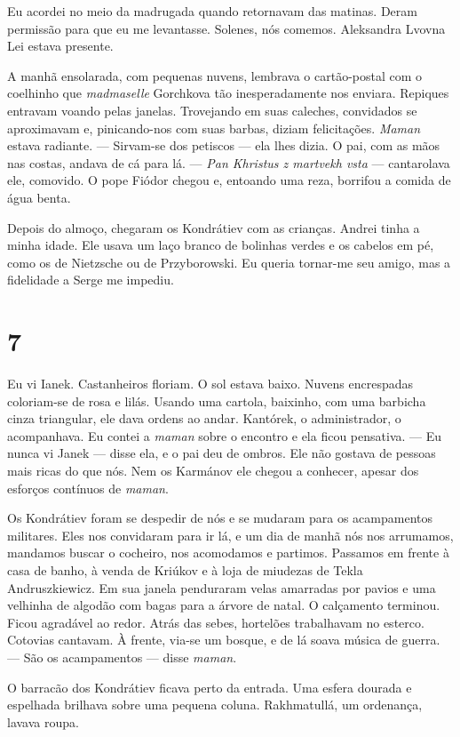 Eu acordei no meio da madrugada quando retornavam das matinas. Deram
permissão para que eu me levantasse. Solenes, nós comemos. Aleksandra
Lvovna Lei estava presente.

A manhã ensolarada, com pequenas nuvens, lembrava o cartão-postal com o
coelhinho que \emph{madmaselle} Gorchkova tão inesperadamente nos
enviara. Repiques entravam voando pelas janelas. Trovejando em suas
caleches, convidados se aproximavam e, pinicando-nos com suas barbas,
diziam felicitações. \emph{Maman} estava radiante. --- Sirvam-se dos
petiscos --- ela lhes dizia. O pai, com as mãos nas costas, andava de cá
para lá. --- \emph{Pan Khristus z martvekh vsta} --- cantarolava ele,
comovido. O pope Fiódor chegou e, entoando uma reza, borrifou a comida
de água benta.

Depois do almoço, chegaram os Kondrátiev com as crianças. Andrei tinha a
minha idade. Ele usava um laço branco de bolinhas verdes e os cabelos em
pé, como os de Nietzsche ou de Przyborowski. Eu queria tornar-me seu
amigo, mas a fidelidade a Serge me impediu.

\section{7}

Eu vi Ianek. Castanheiros floriam. O sol estava baixo. Nuvens
encrespadas coloriam-se de rosa e lilás. Usando uma cartola, baixinho,
com uma barbicha cinza triangular, ele dava ordens ao andar. Kantórek, o
administrador, o acompanhava. Eu contei a \emph{maman} sobre o encontro
e ela ficou pensativa. --- Eu nunca vi Janek --- disse ela, e o pai deu
de ombros. Ele não gostava de pessoas mais ricas do que nós. Nem os
Karmánov ele chegou a conhecer, apesar dos esforços contínuos de
\emph{maman}.

Os Kondrátiev foram se despedir de nós e se mudaram para os acampamentos
militares. Eles nos convidaram para ir lá, e um dia de manhã nós nos
arrumamos, mandamos buscar o cocheiro, nos acomodamos e partimos.
Passamos em frente à casa de banho, à venda de Kriúkov e à loja de
miudezas de Tekla Andruszkiewicz. Em sua janela penduraram velas
amarradas por pavios e uma velhinha de algodão com bagas para a árvore
de natal. O calçamento terminou. Ficou agradável ao redor. Atrás das
sebes, hortelões trabalhavam no esterco. Cotovias cantavam. À frente,
via-se um bosque, e de lá soava música de guerra. --- São os
acampamentos --- disse \emph{maman}.

O barracão dos Kondrátiev ficava perto da entrada. Uma esfera dourada e
espelhada brilhava sobre uma pequena coluna. Rakhmatullá, um ordenança,
lavava roupa.


